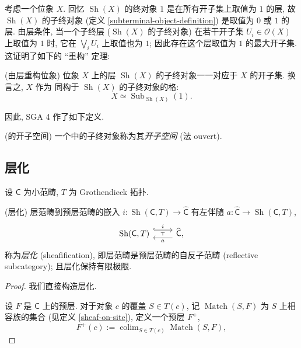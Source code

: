 考虑一个位象 $X$. 回忆 $\operatorname{Sh}(X)$ 的终对象 $1$ 是在所有开子集上取值为 $1$ 的层, 故 $\operatorname{Sh}(X)$ 的子终对象 (定义 \ref{subterminal-object-definition}) 是取值为 $0$ 或 $1$ 的层. 由层条件, 当一个子终层 ($\operatorname{Sh}(X)$ 的子终对象) 在若干开子集 $U_i\in\mathcal O(X)$ 上取值为 $1$ 时, 它在 $\bigvee_i U_i$ 上取值也为 $1$; 因此存在这个层取值为 $1$ 的最大开子集. 这证明了如下的 ``重构'' 定理:

\begin{prop}
	{(由层\topos{}重构位象)}
	位象 $X$ 上的层\topos{} $\operatorname{Sh}(X)$ 的子终对象一一对应于 $X$ 的开子集. 换言之, $X$ 作为\fm{} 同构于 $\operatorname{Sh}(X)$ 的子终对象的格:
	$$
	X \simeq \operatorname{Sub}_{\operatorname{Sh}(X)}(1).
	$$
\end{prop}

因此, SGA 4 \cite{SGA4} 作了如下定义.

\begin{definition}
	[label={ouvert}]
	{(\topos{}的开子空间)}
	一个\topos{}中的子终对象称为其\emph{开子空间} (法 ouvert).
\end{definition}

\subsection{层化}

设 $\mathsf C$ 为小范畴, $T$ 为 Grothendieck 拓扑.

\begin{prop}
	[label={sheafification}]
    {(层化)}
    层范畴到预层范畴的嵌入 $i\colon \operatorname{Sh}(\mathsf C,T)\to \widehat {\mathsf C}$ 有左伴随 $a\colon \widehat {\mathsf C}\to\operatorname{Sh}(\mathsf C,T)$,
\[\begin{tikzcd}[ampersand replacement=\&]
	{\operatorname{Sh}(\mathsf C,T)} \& {\widehat {\mathsf C},}
	\arrow[""{name=0, anchor=center, inner sep=0}, "a", shift left=2, from=1-2, to=1-1]
	\arrow[""{name=1, anchor=center, inner sep=0}, "i", shift left=2, hook, from=1-1, to=1-2]
	\arrow["\dashv"{anchor=center, rotate=90}, draw=none, from=0, to=1]
\end{tikzcd}\]
    称为\emph{层化} (sheafification),
    即层范畴是预层范畴的自反子范畴 (reflective subcategory);
    且层化保持有限极限.
\end{prop}

\begin{proof}
    我们直接构造层化.
    
    设 $F$ 是 $\mathsf C$ 上的预层.
    对于对象 $c$ 的覆盖 $S \in T(c)$,
    记 $\operatorname{Match}(S,F)$
    为 $S$ 上相容族的集合 (见定义 \ref{sheaf-on-site}),
    定义一个预层 $F^+$,
    $$
    F^+(c):=\operatorname{colim}_{S\in T(c)}\operatorname{Match}(S,F),
    $$
\end{proof}

